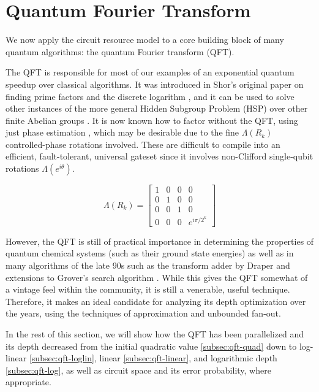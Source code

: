\section{Quantum Fourier Transform}
\label{sec:qft}

We now apply the circuit resource model to a core building block of
many quantum algorithms: the quantum Fourier transform (QFT).

The QFT is responsible for most of our examples of an exponential quantum
speedup over classical algorithms. It was introduced in Shor's
original paper on finding prime factors and the discrete logarithm
\cite{Shor1995}, and it can be used to solve
other instances of the more general Hidden Subgroup Problem (HSP)
\cite{Lomont2004} over other finite Abelian groups \cite{Nielsen2000}.
It is now known
how to factor without the QFT,
using just phase estimation \cite{Kitaev2002} \cite{Cleve2000}, which may
be desirable due to the fine $\Lambda(R_k)$ controlled-phase rotations involved.
These are difficult to compile into an efficient, fault-tolerant, universal
gateset since it involves non-Clifford single-qubit rotations $\Lambda(e^{i\theta})$.

\begin{equation}
\label{eqn:rk}
\Lambda(R_k) = \left[ \begin{array}{cccc}
1 & 0 & 0 & 0\\
0 & 1 & 0 & 0\\
0 & 0 & 1 & 0\\
0 & 0 & 0 & e^{i\pi / 2^k}
\end{array}
\right]
\end{equation}

However, the QFT is still of practical importance
in determining the
properties of quantum chemical systems
(such as their ground state energies) \cite{Wang2008} as well as in
many algorithms of the late 90s such as
the transform adder by Draper \cite{Draper2000} and extensions to Grover's
search algorithm \cite{Grover1996} \cite{Brassard1998} \cite{Mosca1999}.
While this gives the QFT somewhat of a vintage feel within the community,
it is still a venerable, useful technique.
Therefore, it makes an ideal candidate for analyzing its depth optimization
over the years, using the techniques
of approximation and unbounded fan-out.

In the rest of this section,
we will show how the QFT has been parallelized and its depth decreased from the
initial quadratic
value \ref{subsec:qft-quad} down to
log-linear \ref{subsec:qft-loglin},
linear \ref{subsec:qft-linear}, and logarithmic depth \ref{subsec:qft-log},
as well as circuit space and its error probability, where
appropriate. 


